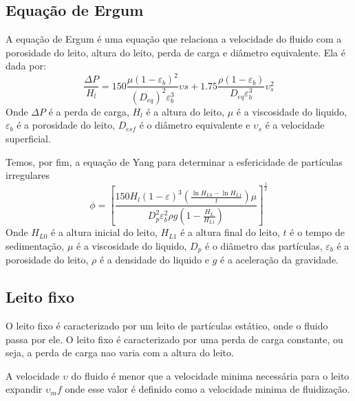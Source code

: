 \subsection{Equação de Ergum}
A equação de Ergum é uma equação que relaciona a velocidade do fluido
com a porosidade do leito, altura do leito, perda de carga e diâmetro equivalente. Ela é dada por:
\begin{equation}
    \frac{\Delta P}{H_{l}} = 150 \frac{\mu \left( 1 - \varepsilon _{b}  \right) ^{2}}{\left( D_{eq}  \right) ^{2} \varepsilon _{b} ^{3} } \upsilon s + 1.75 \frac{\rho \left( 1 - \varepsilon _{b}  \right) }{D_{eq} \varepsilon _{b} ^{3}  }\upsilon _{s} ^{2} 
\end{equation}
Onde \(\Delta P\) é a perda de carga, \(H_{l}\) é a altura do leito, \(\mu \) é a viscosidade do
liquido, \(\varepsilon _{b} \) é a porosidade do leito, \(D_{esf} \) é o diâmetro equivalente e
\(\upsilon _{s} \) é a velocidade superficial. \par Temos, por fim, a equação de Yang para
determinar a esfericidade de partículas irregulares
\begin{equation}
    \phi = \left[ \frac{150H_{l} (1-\varepsilon )^{3} \left( \frac{\ln H_{L0} - \ln H_{L1}  }{t }  \right)\mu  }{D_{p} ^{2} \varepsilon _b ^{2} \rho g \left( 1 - \frac{H_{L} }{H_{L1} } \right) } \right]^{\frac{1}{2}} 
\end{equation}
Onde \(H_{L0} \) é a altura inicial do leito, \(H_{L1} \) é a altura final do leito, \(t\) é o tempo
de sedimentação, \(\mu \) é a viscosidade do liquido, \(D_{p} \) é o diâmetro das partículas,
\(\varepsilon _{b} \) é a porosidade do leito, \(\rho \) é a densidade do liquido e \(g\) é a
aceleração da gravidade.
\subsection{Leito fixo}
O leito fixo é caracterizado por um leito de partículas estático, onde o fluido passa por ele. O
leito fixo é caracterizado por uma perda de carga constante, ou seja, a perda de carga nao varia com
a altura do leito. \par

A velocidade \(\upsilon \) do fluido é menor que a velocidade minima necessária para o leito
expandir \(\upsilon _mf\) onde esse valor é definido como a velocidade minima de fluidização. \par

